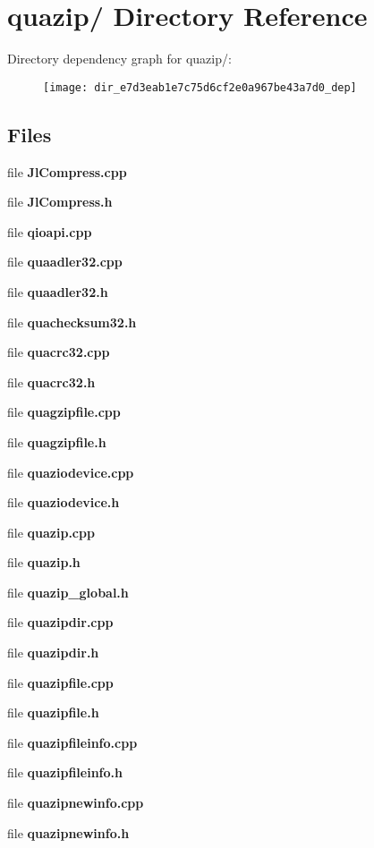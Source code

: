\section{quazip/ Directory Reference}
\label{dir_e7d3eab1e7c75d6cf2e0a967be43a7d0}
Directory dependency graph for quazip/:
\nopagebreak
\begin{figure}[H]
\begin{center}
\leavevmode
\texttt{[image: dir\_e7d3eab1e7c75d6cf2e0a967be43a7d0\_dep]}
\end{center}
\end{figure}
\subsection*{Files}
\begin{DoxyCompactItemize}
\item 
file {\bfseries JlCompress.cpp}
\item 
file {\bfseries JlCompress.h}
\item 
file {\bfseries qioapi.cpp}
\item 
file {\bfseries quaadler32.cpp}
\item 
file {\bfseries quaadler32.h}
\item 
file {\bfseries quachecksum32.h}
\item 
file {\bfseries quacrc32.cpp}
\item 
file {\bfseries quacrc32.h}
\item 
file {\bfseries quagzipfile.cpp}
\item 
file {\bfseries quagzipfile.h}
\item 
file {\bfseries quaziodevice.cpp}
\item 
file {\bfseries quaziodevice.h}
\item 
file {\bfseries quazip.cpp}
\item 
file {\bfseries quazip.h}
\item 
file {\bfseries quazip\_\-global.h}
\item 
file {\bfseries quazipdir.cpp}
\item 
file {\bfseries quazipdir.h}
\item 
file {\bfseries quazipfile.cpp}
\item 
file {\bfseries quazipfile.h}
\item 
file {\bfseries quazipfileinfo.cpp}
\item 
file {\bfseries quazipfileinfo.h}
\item 
file {\bfseries quazipnewinfo.cpp}
\item 
file {\bfseries quazipnewinfo.h}
\end{DoxyCompactItemize}
